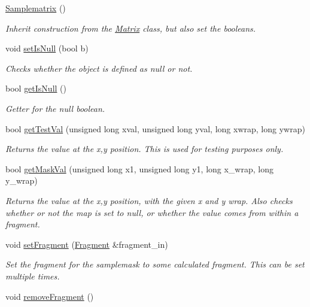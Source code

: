 \begin{DoxyCompactItemize}
\item 
\hyperlink{class_samplematrix_abe3fb4ca1e24678f2720f451cee80492}{Samplematrix} ()\hypertarget{class_samplematrix_abe3fb4ca1e24678f2720f451cee80492}{}\label{class_samplematrix_abe3fb4ca1e24678f2720f451cee80492}

\begin{DoxyCompactList}\small\item\em Inherit construction from the \hyperlink{class_matrix}{Matrix} class, but also set the booleans. \end{DoxyCompactList}\item 
void \hyperlink{class_samplematrix_ac983c4f86579ed522de98bc1d0bfa3d6}{set\+Is\+Null} (bool b)
\begin{DoxyCompactList}\small\item\em Checks whether the object is defined as null or not. \end{DoxyCompactList}\item 
bool \hyperlink{class_samplematrix_a2c893703e39fa5c167e67ec91d544ade}{get\+Is\+Null} ()
\begin{DoxyCompactList}\small\item\em Getter for the null boolean. \end{DoxyCompactList}\item 
bool \hyperlink{class_samplematrix_a834c750ab142d1ed2241fb9ab559b704}{get\+Test\+Val} (unsigned long xval, unsigned long yval, long xwrap, long ywrap)
\begin{DoxyCompactList}\small\item\em Returns the value at the x,y position. This is used for testing purposes only. \end{DoxyCompactList}\item 
bool \hyperlink{class_samplematrix_a8b494886260857ffdc9f52f47661a628}{get\+Mask\+Val} (unsigned long x1, unsigned long y1, long x\+\_\+wrap, long y\+\_\+wrap)
\begin{DoxyCompactList}\small\item\em Returns the value at the x,y position, with the given x and y wrap. Also checks whether or not the map is set to null, or whether the value comes from within a fragment. \end{DoxyCompactList}\item 
void \hyperlink{class_samplematrix_adbc1732a726c387965f63d4484bd4c25}{set\+Fragment} (\hyperlink{struct_fragment}{Fragment} \&fragment\+\_\+in)
\begin{DoxyCompactList}\small\item\em Set the fragment for the samplemask to some calculated fragment. This can be set multiple times. \end{DoxyCompactList}\item 
void \hyperlink{class_samplematrix_a9b796f2279f1716c2a555ff3d641ea0b}{remove\+Fragment} ()\hypertarget{class_samplematrix_a9b796f2279f1716c2a555ff3d641ea0b}{}\label{class_samplematrix_a9b796f2279f1716c2a555ff3d641ea0b}


\end{DoxyCompactItemize}
